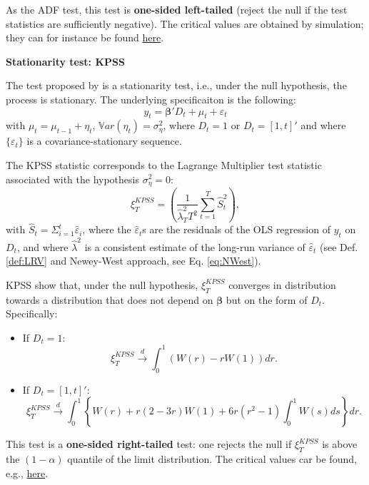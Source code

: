 \documentclass[
  12pt,
]{book}
\providecommand{\tightlist}{%
  \setlength{\itemsep}{0pt}\setlength{\parskip}{0pt}}
\theoremstyle{definition}
\theoremstyle{definition}
\theoremstyle{definition}
\theoremstyle{definition}
\theoremstyle{remark}
\begin{document}
As the ADF test, this test is \textbf{one-sided left-tailed} (reject the null if the test statistics are sufficiently negative). The critical values are obtained by simulation; they can for instance be found \href{http://www.econ.uiuc.edu/~econ508/DFtable.pdf}{here}.

\textbf{Stationarity test: KPSS}

The test proposed by \citet{KWIATKOWSKI1992159} is a stationarity test, i.e., under the null hypothesis, the process is stationary. The underlying specificaiton is the following:
\[
y_t = \boldsymbol\beta' D_t + \mu_t + \varepsilon_t
\]
with \(\mu_t = \mu_{t-1} + \eta_t\), \(\mathbb{V}ar(\eta_t)=\sigma_\eta^2\), where \(D_t = 1\) or \(D_t = [1,t]'\) and where \(\{\varepsilon_t\}\) is a covariance-stationary sequence.

The KPSS statistic corresponds to the Lagrange Multiplier test statistic associated with the hypothesis \(\sigma_\eta^2=0\):
\[
\boxed{\xi^{KPSS}_T = \left(\frac{1}{\hat\lambda_T^2 T^2}\sum_{t=1}^T\hat{S}_t^2\right),}
\]
with \(\hat{S}_t=\Sigma_{i=1}^t \hat{\varepsilon}_i\), where the \(\hat{\varepsilon}_t\)s are the residuals of the OLS regression of \(y_t\) on \(D_t\), and where \(\hat\lambda^2\) is a consistent estimate of the long-run variance of \(\hat{\varepsilon}_t\) (see Def. \ref{def:LRV} and Newey-West approach, see Eq. \eqref{eq:NWest}).

KPSS show that, under the null hypothesis, \(\xi^{KPSS}_T\) converges in distribution towards a distribution that does not depend on \(\boldsymbol\beta\) but on the form of \(D_t\). Specifically:

\begin{itemize}
\tightlist
\item
  If \(D_t = 1\):
  \[
  \xi^{KPSS}_T \overset{d}{\rightarrow} \int_{0}^1 (W(r)-rW(1))dr.
  \]
\item
  If \(D_t = [1,t]'\):
  \[
  \xi^{KPSS}_T \overset{d}{\rightarrow} \int_{0}^1 \left\{W(r) + r(2-3r)W(1) + 6r(r^2-1)\int_{0}^{1}W(s)ds\right\}dr.
  \]
\end{itemize}

This test is a \textbf{one-sided right-tailed} test: one rejects the null if \(\xi^{KPSS}_T\) is above the \((1-\alpha)\) quantile of the limit distribution. The critical values car be found, e.g., \href{http://www.statisticshowto.com/kpss-test/}{here}.
\end{document}
